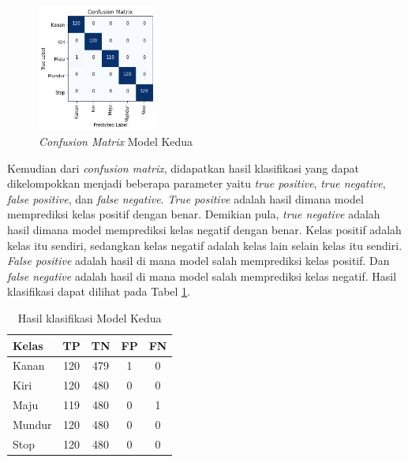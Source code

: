 \begin{figure} [H] \centering
  \includegraphics[width=0.35\textwidth]{gambar/bab4/modelkedua/modelkedua.png}
  \caption{\emph{Confusion Matrix} Model Kedua}
  \label{fig:matrix1}
\end{figure}

Kemudian dari \emph{confusion matrix}, didapatkan hasil klasifikasi yang dapat dikelompokkan menjadi beberapa parameter yaitu \emph{true positive}, \emph{true negative}, \emph{false positive}, dan \emph{false negative}. \emph{True positive} adalah hasil dimana model memprediksi kelas positif dengan benar. Demikian pula, \emph{true negative} adalah hasil dimana model memprediksi kelas negatif dengan benar. Kelas positif adalah kelas itu sendiri, sedangkan kelas negatif adalah kelas lain selain kelas itu sendiri. \emph{False positive} adalah hasil di mana model salah memprediksi kelas positif. Dan \emph{false negative} adalah hasil di mana model salah memprediksi kelas negatif. Hasil klasifikasi dapat dilihat pada Tabel \ref{tb:cm_model}.

\begin{longtable}{|l|c|c|c|c|}
  \caption{Hasil klasifikasi Model Kedua}
  \label{tb:cm_model} \\
  \hline
  \rowcolor[HTML]{C0C0C0} 
  \textbf{Kelas} & \textbf{TP} & \textbf{TN} & \textbf{FP} & \textbf{FN} \\ \hline
  Kanan    & 120          & 479         & 1           & 0           \\ \hline
  Kiri      & 120          & 480         & 0           & 0           \\ \hline
  Maju      & 119          & 480         & 0           & 1           \\ \hline
  Mundur     & 120          & 480         & 0           & 0           \\ \hline
  Stop  & 120          & 480         & 0           & 0           \\ \hline
\end{longtable}

